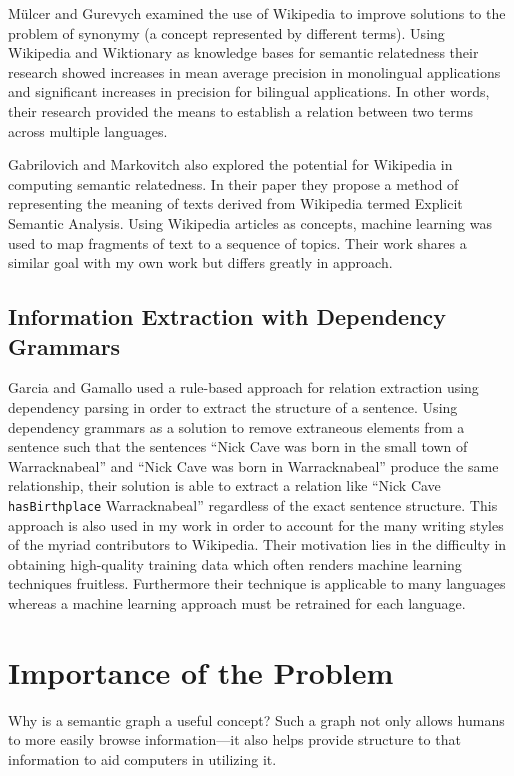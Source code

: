 M\"ulcer and Gurevych \cite{Muller:2008:UWW:1813809.1813844} examined the use of Wikipedia to improve solutions to the problem of synonymy (a concept represented by different terms).  Using Wikipedia and Wiktionary as knowledge bases for semantic relatedness their research showed increases in mean average precision in monolingual applications and significant increases in precision for bilingual applications.  In other words, their research provided the means to establish a relation between two terms across multiple languages.

Gabrilovich and Markovitch \cite{Gabrilovich:2007:CSR:1625275.1625535} also explored the potential for Wikipedia in computing semantic relatedness.  In their paper they propose a method of representing the meaning of texts derived from Wikipedia termed Explicit Semantic Analysis.  Using Wikipedia articles as concepts, machine learning was used to map fragments of text to a sequence of topics.  Their work shares a similar goal with my own work but differs greatly in approach.

\section{Information Extraction with Dependency Grammars}

Garcia and Gamallo \cite{garcia-gamallo:2011:IEKA} used a rule-based approach for relation extraction using dependency parsing in order to extract the structure of a sentence.  Using dependency grammars as a solution to remove extraneous elements from a sentence such that the sentences ``Nick Cave was born in the small town of Warracknabeal'' and ``Nick Cave was born in Warracknabeal'' produce the same relationship, their solution is able to extract a relation like ``Nick Cave \verb|hasBirthplace| Warracknabeal'' regardless of the exact sentence structure.  This approach is also used in my work in order to account for the many writing styles of the myriad contributors to Wikipedia.  Their motivation lies in the difficulty in obtaining high-quality training data which often renders machine learning techniques fruitless.  Furthermore their technique is applicable to many languages whereas a machine learning approach must be retrained for each language.

\chapter{Importance of the Problem}

Why is a semantic graph a useful concept?  Such a graph not only allows humans to more easily browse information---it also helps provide structure to that information to aid computers in utilizing it.  

